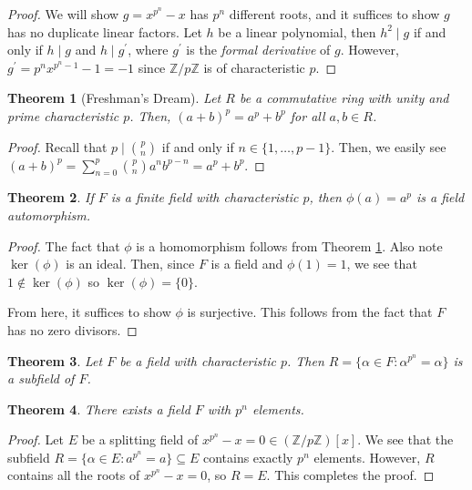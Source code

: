 \documentclass[
    parskip=half,
    toc=flat,
    toc=sectionentrydotfill,
]{scrartcl}  %
\theoremstyle{definition}
\theoremstyle{plain}
\newtheorem{theorem}{Theorem}[definition]
\theoremstyle{remark}
\begin{document}
\begin{proof}
    We will show $g=x^{p^n}-x$ has $p^n$ different roots, and it suffices to show $g$ has no
    duplicate linear factors.
    Let $h$ be a linear polynomial, then $h^2\mid g$ if and only if $h\mid g$ and $h\mid g^\prime$,
    where $g^\prime$ is the \textit{formal derivative} of $g$.
    However, $g^\prime=p^nx^{p^n-1}-1=-1$ since $\mathbb{Z}/p\mathbb{Z}$ is of characteristic $p$.
\end{proof}

\begin{theorem}[Freshman's Dream]
    \label{Freshman's Dream}
    Let $R$ be a commutative ring with unity and prime characteristic $p$.
    Then, $(a+b)^p=a^p+b^p$ for all $a,b\in R$.
\end{theorem}

\begin{proof}
    Recall that $p\mid\binom{p}{n}$ if and only if $n\in\{1,\dots,p-1\}$.
    Then, we easily see $(a+b)^p=\sum_{n=0}^p\binom{p}{n}a^nb^{p-n}=a^p+b^p$.
\end{proof}

\begin{theorem}
    If $F$ is a finite field with characteristic $p$, then $\phi(a)=a^p$ is a field automorphism.
\end{theorem}

\begin{proof}
    The fact that $\phi$ is a homomorphism follows from Theorem \ref{Freshman's Dream}.
    Also note $\ker(\phi)$ is an ideal.
    Then, since $F$ is a field and $\phi(1)=1$, we see that $1\notin\ker(\phi)$ so $\ker(\phi)=\{0\}$.

    From here, it suffices to show $\phi$ is surjective.
    This follows from the fact that $F$ has no zero divisors.
\end{proof}

\begin{theorem}
    Let $F$ be a field with characteristic $p$.
    Then $R=\{\alpha\in F:\alpha^{p^n}=\alpha\}$ is a subfield of $F$.
\end{theorem}

\begin{theorem}
    There exists a field $F$ with $p^n$ elements.
\end{theorem}

\begin{proof}
    Let $E$ be a splitting field of $x^{p^n}-x=0\in (\mathbb{Z}/p\mathbb{Z})[x]$.
    We see that the subfield $R=\{\alpha\in E:a^{p^n}=a\}\subseteq E$ contains exactly $p^n$ elements.
    However, $R$ contains all the roots of $x^{p^n}-x=0$, so $R=E$.
    This completes the proof.
\end{proof}
\end{document}
